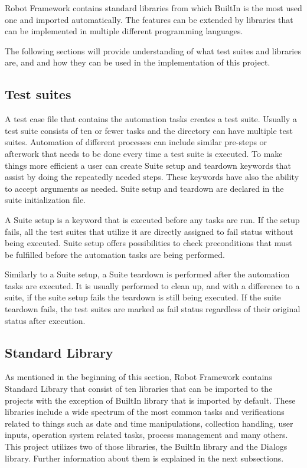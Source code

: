 Robot Framework contains standard libraries from which BuiltIn is the most used one and imported automatically.
The features can be extended by libraries that can be implemented in multiple different programming languages.

The following sections will provide understanding of what test suites and libraries are, and and how they can be used in the implementation of this project.

\subsection{Test suites}
A test case file that contains the automation tasks creates a test suite. Usually a test suite consists of ten or fewer tasks and the directory can have multiple test suites.
Automation of different processes can include similar pre-steps or afterwork that needs to be done every time a test suite is executed.
To make things more efficient a user can create Suite setup and teardown keywords that assist by doing the repeatedly needed steps.
These keywords have also the ability to accept arguments as needed.
Suite setup and teardown are declared in the suite initialization file.

A Suite setup is a keyword that is executed before any tasks are run.
If the setup fails, all the test suites that utilize it are directly assigned to fail status without being executed.
Suite setup offers possibilities to check preconditions that must be fulfilled before the automation tasks are being performed.

Similarly to a Suite setup, a Suite teardown is performed after the automation tasks are executed.
It is usually performed to clean up, and with a difference to a suite, if the suite setup fails the teardown is still being executed.
If the suite teardown fails, the test suites are marked as fail status regardless of their original status after execution.
\cite{robotFrameworkUserGuide:suiteSetupAndTeardown}

\subsection{Standard Library}
As mentioned in the beginning of this section, Robot Framework contains Standard Library that consist of ten libraries that can be imported to the projects with the exception of BuiltIn library that is imported by default.
These libraries include a wide spectrum of the most common tasks and verifications related to things such as date and time manipulations, collection handling, user inputs, operation system related tasks, process management and many others.
This project utilizes two of those libraries, the BuiltIn library and the Dialogs library.
Further information about them is explained in the next subsections.
\cite{robotFramework:standardLibrary}

